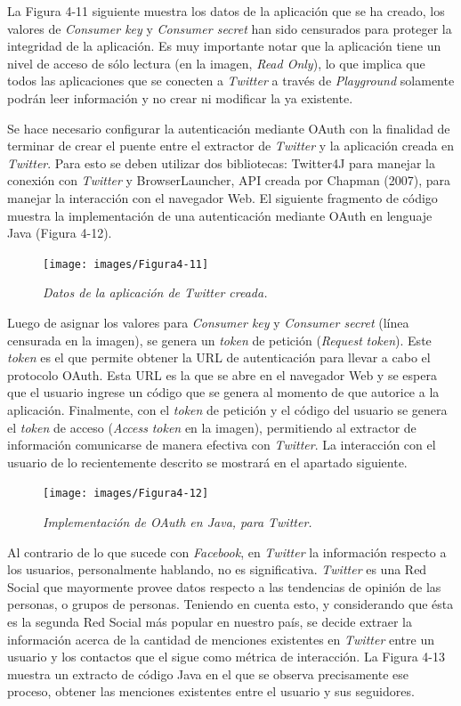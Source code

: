 La Figura 4-11 siguiente muestra los datos de la aplicación que se ha creado, los valores de \textit{Consumer key} y \textit{Consumer secret} han sido censurados para proteger la integridad de la aplicación. Es muy importante notar que la aplicación tiene un nivel de acceso de sólo lectura (en la imagen, \textit{Read Only}), lo que implica que todos las aplicaciones que se conecten a \textit{Twitter} a través de \textit{Playground} solamente podrán leer información y no crear ni modificar la ya existente.

Se hace necesario configurar la autenticación mediante OAuth con la finalidad de terminar de crear el puente entre el extractor de \textit{Twitter} y la aplicación creada en \textit{Twitter}. Para esto se deben utilizar dos bibliotecas: Twitter4J para manejar la conexión con \textit{Twitter} y BrowserLauncher, API creada por Chapman (2007), para manejar la interacción con el navegador Web. El siguiente fragmento de código muestra la implementación de una autenticación mediante OAuth en lenguaje Java (Figura 4-12).

\begin{figure}[h]
	\centering
	\texttt{[image: images/Figura4-11]}
	\caption{\em Datos de la aplicación de Twitter creada.}
	\label{fig:ext-im11}
\end{figure}


Luego de asignar los valores para \textit{Consumer key} y \textit{Consumer secret} (línea censurada en la imagen), se genera un \textit{token} de petición (\textit{Request} \textit{token}). Este \textit{token} es el que permite obtener la URL de autenticación para llevar a cabo el protocolo OAuth. Esta URL es la que se abre en el navegador Web y se espera que el usuario ingrese un código que se genera al momento de que autorice a la aplicación. Finalmente, con el \textit{token} de petición y el código del usuario se genera el \textit{token} de acceso (\textit{Access} \textit{token} en la imagen), permitiendo al extractor de información comunicarse de manera efectiva con \textit{Twitter}. La interacción con el usuario de lo recientemente descrito se mostrará en el apartado siguiente.

\begin{figure}[h]
	\centering
	\texttt{[image: images/Figura4-12]}
	\caption{\em Implementación de OAuth en Java, para Twitter.}
	\label{fig:ext-im12}
\end{figure}

Al contrario de lo que sucede con \textit{Facebook}, en \textit{Twitter} la información respecto a los usuarios, personalmente hablando, no es significativa. \textit{Twitter} es una Red Social que mayormente provee datos respecto a las tendencias de opinión de las personas, o grupos de personas. Teniendo en cuenta esto, y considerando que ésta es la segunda Red Social más popular en nuestro país, se decide extraer la información acerca de la cantidad de menciones existentes en \textit{Twitter} entre un usuario y los contactos que el sigue como métrica de interacción. La Figura 4-13 muestra un extracto de código Java en el que se observa precisamente ese proceso, obtener las menciones existentes entre el usuario y sus seguidores. 

